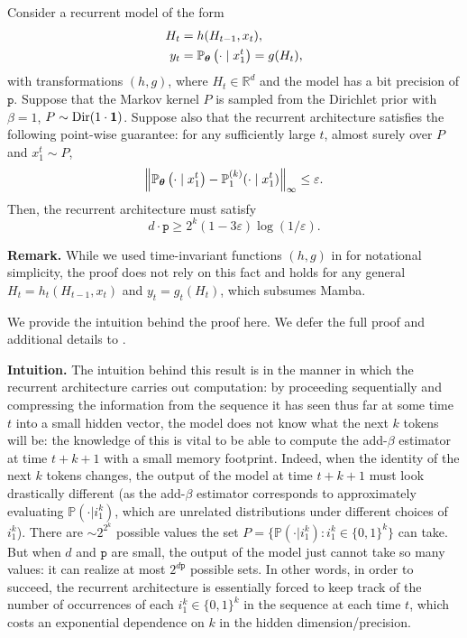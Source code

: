 \begin{theorem}
\label{thm:lower-bound}
Consider a recurrent model of the form 
\begin{align*}
H_t &= h (H_{t-1},x_t), \\
y_t &= \mathbb{P}_{\bm{\theta}}\left(\cdot \mid x_1^t\right) = g(H_t),
\end{align*} 
with transformations $(h,g)$, where $H_t \in \mathbb{R}^d$ and the model has a bit precision of $\mathtt{p}$. Suppose that the Markov kernel $P$ is sampled from the Dirichlet prior with $\beta=1$, $P \sim \mathrm{Dir}(1 \cdot \bm{1})$. Suppose also that the recurrent architecture satisfies the following point-wise guarantee: for any sufficiently large $t$, almost surely over $P$ and $x_1^t \sim P$,
\begin{equation} \label{eq:41}
    \left\| \mathbb{P}_{\bm{\theta}}\left(\cdot \mid x_1^t\right) - \mathbb{P}_{1}^{(k)}(\cdot \mid x_1^t) \right\|_\infty \le \varepsilon.
\end{equation}
Then, the recurrent architecture must satisfy
\begin{equation*}
    d \cdot \mathtt{p} \ge 2^k (1 - 3 \varepsilon) \log (1/\varepsilon).
\end{equation*}
\end{theorem}

{\bf Remark.} While we used time-invariant functions $(h,g)$ in  for notational simplicity, the proof does not rely on this fact and holds for any general $H_t = h_t (H_{t-1},x_t)$ and $y_t = g_t (H_t)$, which subsumes Mamba.

We provide the intuition behind the proof here. We defer the full proof and additional details to .

{\bf Intuition.} The intuition behind this result is in the manner in which the recurrent architecture carries out computation: by proceeding sequentially and compressing the information from the sequence it has seen thus far at some time $t$ into a small hidden vector, the model does not know what the next $k$ tokens will be: the knowledge of this is vital to be able to compute the add-$\beta$ estimator at time $t+k+1$ with a small memory footprint. Indeed, when the identity of the next $k$ tokens changes, the output of the model at time $t+k+1$ must look drastically different (as the add-$\beta$ estimator corresponds to approximately evaluating $\mathbb{P}(\cdot|i_1^k)$, which are unrelated distributions under different choices of $i_1^k$). There are $\sim 2^{2^k}$ possible values the set $P = \{ \mathbb{P}(\cdot|i_1^k) : i_1^k \in \{0,1\}^k \}$ can take. But when $d$ and $\mathtt{p}$ are small, the output of the model just cannot take so many values: it can realize at most $2^{d\mathtt{p}}$ possible sets. In other words, in order to succeed, the recurrent architecture is essentially forced to keep track of the number of occurrences of each $i_1^k \in \{ 0,1 \}^k$ in the sequence at each time $t$, which costs an exponential dependence on $k$ in the hidden dimension/precision.